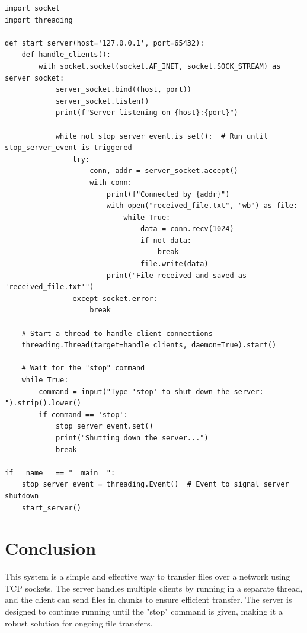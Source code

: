 \documentclass{article}
\begin{document}
\begin{lstlisting}[style=mypython]
import socket
import threading

def start_server(host='127.0.0.1', port=65432):
    def handle_clients():
        with socket.socket(socket.AF_INET, socket.SOCK_STREAM) as server_socket:
            server_socket.bind((host, port))
            server_socket.listen()
            print(f"Server listening on {host}:{port}")
            
            while not stop_server_event.is_set():  # Run until stop_server_event is triggered
                try:
                    conn, addr = server_socket.accept()
                    with conn:
                        print(f"Connected by {addr}")
                        with open("received_file.txt", "wb") as file:
                            while True:
                                data = conn.recv(1024)
                                if not data:
                                    break
                                file.write(data)
                        print("File received and saved as 'received_file.txt'")
                except socket.error:
                    break
    
    # Start a thread to handle client connections
    threading.Thread(target=handle_clients, daemon=True).start()
    
    # Wait for the "stop" command
    while True:
        command = input("Type 'stop' to shut down the server: ").strip().lower()
        if command == 'stop':
            stop_server_event.set()
            print("Shutting down the server...")
            break

if __name__ == "__main__":
    stop_server_event = threading.Event()  # Event to signal server shutdown
    start_server()
\end{lstlisting}





\section{Conclusion}

This system is a simple and effective way to transfer files over a network using TCP sockets. The server handles multiple clients by running in a separate thread, and the client can send files in chunks to ensure efficient transfer. The server is designed to continue running until the "stop" command is given, making it a robust solution for ongoing file transfers.
\end{document}
